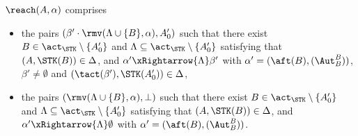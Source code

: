\begin{definition} \label{def:reach}
	$\reach(A, \alpha)$ comprises
%
 \begin{itemize}
     \item the pairs $(\beta'\cdot\rmv(\Lambda\cup\{B\},\alpha), A_0')$ such that there exist $B\in\act_{\STK}\setminus\{A_0'\}$ and $\Lambda\subseteq\act_{\STK}\setminus\{A_0'\}$ satisfying that $(A,\STK(B))\in\Delta$, and $\alpha'\xRightarrow{\Lambda}\beta'$ with $\alpha' = (\aft(B),(\Aut_B^B))$, $\beta'\neq\emptyset$ and $(\tact(\beta'),\STK(A_0'))\in\Delta$,
%
\item the pairs $(\rmv(\Lambda\cup\{B\},\alpha), \bot)$ such that there exist $B\in\act_{\STK}\setminus\{A_0'\}$ and $\Lambda\subseteq\act_{\STK}\setminus\{A_0'\}$ satisfying that $(A,\STK(B))\in\Delta$, and $\alpha'\xRightarrow{\Lambda}\emptyset$ with $\alpha'=(\aft(B),(\Aut_B^B))$.
     
 \end{itemize}
\end{definition}
